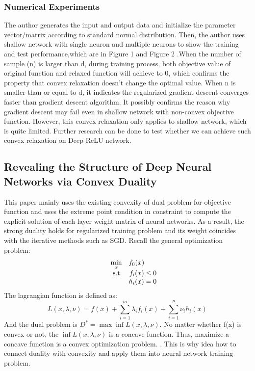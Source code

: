 \documentclass{article}
\begin{document}
\subsubsection{Numerical Experiments}
The author generates the input and output data and initialize the parameter vector/matrix according to standard normal distribution. Then, the author uses shallow network with single neuron and multiple neurons to show the training and test performance,which are in Figure 1 and Figure 2 \cite{cvxrelxation}.When the number of sample (n) is larger than d, during training process, both objective value of original function and relaxed function will achieve to 0, which confirms the property that convex relaxation doesn't change the optimal value. When n is smaller than or equal to d, it indicates the regularized gradient descent converges faster than gradient descent algorithm. It possibly confirms the reason why gradient descent may fail even in shallow network with non-convex objective function. However, this convex relaxation only applies to shallow network, which is quite limited. Further research can be done to test whether we can achieve such convex relaxation on Deep ReLU network.
\subsection{Revealing the Structure of Deep Neural Networks via Convex Duality }
This paper mainly uses the existing convexity of dual problem for objective function and uses the extreme point condition in constraint to compute the explicit solution of each layer weight matrix of neural networks. As a result, the strong duality holds for regularized training problem and its weight coincides with the iterative methods such as SGD.
Recall the general optimization problem:
\begin{equation}
    \begin{array}{rrclcl}
    \displaystyle \min_{x} & \multicolumn{3}{l}{f_0(x)}\\
    \textrm{s.t.} &f_i(x)\leq 0\\
    &h_i(x)=0    
\end{array}
\end{equation}
The lagrangian function is defined as:
\begin{equation}
    L(x,\lambda,\nu)=f(x)+\sum_{i=1}^{m}\lambda_if_i(x)+\sum_{i=1}^{p}\nu_i h_i(x)
\end{equation}
And the dual problem is $D^*=\max \inf L(x,\lambda,\nu)$. No matter whether f(x) is convex or not, the $\inf L(x,\lambda,\nu)$ is a concave function. Thus, maximize a concave function is a convex optimization problem. \cite{boydcvx}. This is why idea how to connect duality with convexity and apply them into neural network training problem. 
\end{document}
